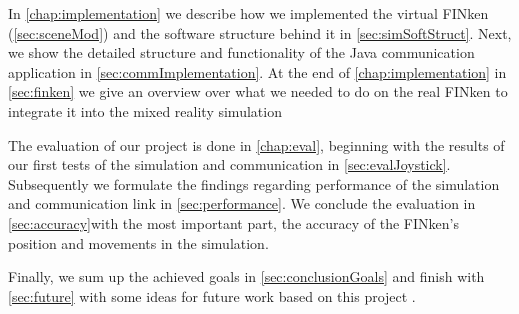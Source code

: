     In \ref{chap:implementation} we describe how we implemented the virtual FINken (\ref{sec:sceneMod}) and the software structure behind it in \ref{sec:simSoftStruct}. 
    Next, we show the detailed structure and functionality of the Java communication application in \ref{sec:commImplementation}.
    At the end of \ref{chap:implementation} in \ref{sec:finken} we give an overview over what we needed to do on the real FINken to integrate it into the mixed reality simulation
    
    The evaluation of our project is done in \ref{chap:eval}, beginning with the results of our first tests of the simulation and communication in \ref{sec:evalJoystick}.
    Subsequently we formulate the findings regarding performance of the simulation and communication link in \ref{sec:performance}.
    We conclude the evaluation in \ref{sec:accuracy}with the most important part, the accuracy of the FINken's position and movements in the simulation.
    
    Finally, we sum up the achieved goals in \ref{sec:conclusionGoals} and finish with \ref{sec:future} with some ideas for future work based on this project . 
    